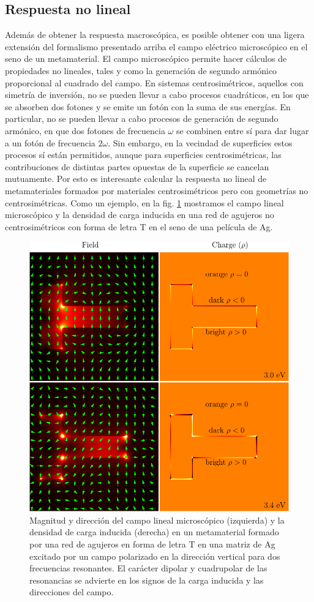 \documentclass[12pt]{article}
\begin{document}
\subsection{Respuesta no lineal}

Además de obtener la respuesta macroscópica, es posible obtener con
una ligera extensión del formalismo presentado arriba el campo
eléctrico microscópico en el seno de un metamaterial. El campo
microscópico permite hacer cálculos de propiedades no lineales, tales
y como la generación de segundo armónico proporcional al cuadrado del
campo. En sistemas
centrosimétricos, aquellos con simetría de inversión, no se pueden
llevar a cabo procesos cuadráticos, en los que se absorben dos fotones
y se emite un fotón con la suma de sus energías. En particular, no se
pueden llevar a cabo procesos de generación de segundo armónico, en
que dos fotones de frecuencia $\omega$ se combinen entre sí para dar
lugar a un fotón de frecuencia $2\omega$. Sin embargo, en la vecindad
de superficies estos procesos sí están permitidos, aunque para
superficies centrosimétricas, las contribuciones de distintas partes
opuestas de la superficie se cancelan mutuamente. Por esto es
interesante calcular la respuesta no lineal de metamateriales formados
por materiales centrosimétricos pero con geometrías no
centrosimétricas. Como un ejemplo,\cite{bms19} en la fig. \ref{fig:lineal}
mostramos el campo lineal microscópico y la densidad de carga inducida
en una red de agujeros no centrosimétricos con forma de letra T en el
seno de una película de Ag.
\begin{figure}
  \centering
  \includegraphics[width=.7\textwidth]{fig18}
  \caption{Magnitud y dirección del campo lineal microscópico
    (izquierda) y la densidad de carga inducida (derecha) en un
    metamaterial formado por una red de agujeros en forma de letra T
    en una matriz de Ag excitado por un campo polarizado en la
    dirección vertical para dos frecuencias resonantes. El carácter
    dipolar y cuadrupolar de las resonancias se advierte en los signos
    de la carga inducida y las direcciones del campo.}
  \label{fig:lineal}
\end{figure}
\end{document}
